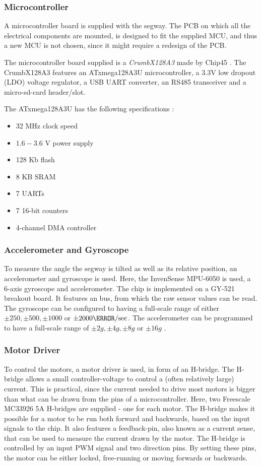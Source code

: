 \subsubsection{Microcontroller}

A microcontroller board is supplied with the segway. The \gls{PCB} on which all the electrical components are mounted, is designed to fit the supplied \gls{MCU}, and thus a new MCU is not chosen, since it might require a redesign of the PCB.

The microcontroller board supplied is a \emph{CrumbX128A3} made by Chip45 \citep{CrumbX128A3}. The CrumbX128A3 features an ATxmega128A3U microcontroller, a 3.3V low dropout (LDO) voltage regulator, a USB UART converter, an RS485 transceiver and a micro-sd-card header/slot.
	
The ATxmega128A3U has the following specifications \citep{xmega}:

\begin{itemize}
\item 32 MHz clock speed
\item $1.6-3.6$ V power supply
\item 128 Kb flash
\item 8 KB SRAM
\item 7 UARTs
\item 7 16-bit counters
\item 4-channel DMA controller
\end{itemize}
\subsubsection{Accelerometer and Gyroscope}
To measure the angle the segway is tilted as well as its relative position, an accelerometer and gyroscope is used. Here, the InvenSense MPU-6050\citep{gyro} is used, a 6-axis gyroscope and accelerometer. The chip is implemented on a GY-521 breakout board. It features an \iic bus, from which the raw sensor values can be read. 
The gyroscope can be configured to having a full-scale range of either $\pm 250, \pm 500, \pm 1000$ or $\pm 2000 \degree /\text{sec}$. The accelerometer can be programmed to have a full-scale range of $\pm 2g, \pm 4g, \pm 8g$ or $\pm 16g$ \citep{gyro}.

\subsubsection{Motor Driver}
To control the motors, a motor driver is used, in form of an H-bridge. The H-bridge allows a small controller-voltage to control a (often relatively large) current. This is practical, since the current needed to drive most motors is bigger than what can be drawn from the pins of a microcontroller. 
Here, two Freescale MC33926 5A H-bridges \citep{hbridge} are supplied - one for each motor. The H-bridge makes it possible for a motor to be run both forward and backwards, based on the input signals to the chip. It also features a feedback-pin, also known as a current sense, that can be used to measure the current drawn by the motor. The H-bridge is controlled by an input PWM signal and two direction pins. By setting these pins, the motor can be either locked, free-running or moving forwards or backwards.

